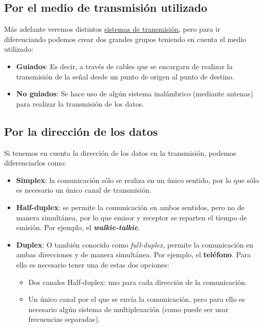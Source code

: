 \subsection{Por el medio de transmisión utilizado}
Más adelante veremos distintos \hyperlink{sistemas_transmision}{sistemas de transmisión}, pero para ir diferenciando podemos crear dos grandes grupos teniendo en cuenta el medio utilizado:

\begin{itemize}
    \item \textbf{Guiados}: Es decir, a través de cables que se encargarn de realizar la transmisión de la señal desde un punto de origen al punto de destino.

    \item \textbf{No guiados}: Se hace uso de algún sistema inalámbrico (mediante antenas) para realizar la transmisión de los datos.
\end{itemize}


\subsection{Por la dirección de los datos}
Si tenemos en cuenta la dirección de los datos en la transmisión, podemos diferenciarlos como:

\begin{itemize}
    \item \textbf{Simplex}: la comunicación sólo se realiza en un único sentido, por lo que sólo es necesario un único canal de transmisión.

    \item \textbf{Half-duplex}: se permite la comunicación en ambos sentidos, pero no de manera simultánea, por lo que emisor y receptor se reparten el tiempo de emisión. Por ejemplo, el \textit{\textbf{walkie-talkie}}.

    \item \textbf{Duplex}: O también conocido como \textit{full-duplex}, permite la comunicación en ambas direcciones y de manera simultánea. Por ejemplo, el \textbf{teléfono}. Para ello es necesario tener una de estas dos opciones:
    \begin{itemize}
        \item Dos canales Half-duplex: uno para cada dirección de la comunicación.
        \item Un único canal por el que se envía la comunicación, pero para ello es necesario algún sistema de multiplexación (como puede ser usar frecuencias separadas).
    \end{itemize}
\end{itemize}


